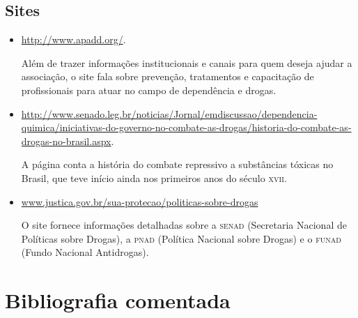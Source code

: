 \documentclass{article}
\begin{document}
\subsection{Sites}

\begin{itemize}
\item\url{http://www.apadd.org/}.

Além de trazer informações institucionais e canais para quem deseja
ajudar a associação, o site fala sobre prevenção, tratamentos e
capacitação de profissionais para atuar no campo de dependência e
drogas.

\item\url{http://www.senado.leg.br/noticias/Jornal/emdiscussao/dependencia-quimica/iniciativas-do-governo-no-combate-as-drogas/historia-do-combate-as-drogas-no-brasil.aspx}.

A página conta a história do combate repressivo a substâncias tóxicas no
Brasil, que teve início ainda nos primeiros anos do século \textsc{xvii}.

\item\url{www.justica.gov.br/sua-protecao/politicas-sobre-drogas}

O site fornece informações detalhadas sobre a \textsc{senad} (Secretaria Nacional
de Políticas sobre Drogas), a \textsc{pnad} (Política Nacional sobre Drogas) e o
\textsc{funad} (Fundo Nacional Antidrogas).
\end{itemize}

\section{Bibliografia comentada}
\end{document}
